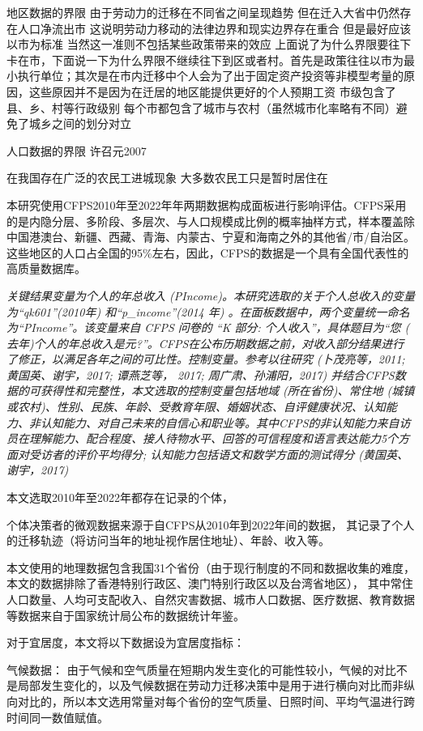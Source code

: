 \documentclass[a4paper,12pt,oneside, fontset=mac]{ctexbook} %
\begin{document}
地区数据的界限
由于劳动力的迁移在不同省之间呈现趋势 但在迁入大省中仍然存在人口净流出市 这说明劳动力移动的法律边界和现实边界存在重合 但是最好应该以市为标准 当然这一准则不包括某些政策带来的效应
上面说了为什么界限要往下卡在市，下面说一下为什么界限不继续往下到区或者村。首先是政策往往以市为最小执行单位；其次是在市内迁移中个人会为了出于固定资产投资等非模型考量的原因，这些原因并不是因为在迁居的地区能提供更好的个人预期工资
市级包含了县、乡、村等行政级别 每个市都包含了城市与农村（虽然城市化率略有不同）避免了城乡之间的划分对立


人口数据的界限
许召元2007

在我国存在广泛的农民工进城现象 大多数农民工只是暂时居住在


本研究使用CFPS2010年至2022年年两期数据构成面板进行影响评估。CFPS采用的是内隐分层、多阶段、多层次、与人口规模成比例的概率抽样方式，样本覆盖除中国港澳台、新疆、西藏、青海、内蒙古、宁夏和海南之外的其他省/市/自治区。这些地区的人口占全国的95\%左右，因此，CFPS的数据是一个具有全国代表性的高质量数据库。

\textit{关键结果变量为个人的年总收入 (PIncome)。本研究选取的关于个人总收入的变量为“qk601”(2010年) 和“p\_income”(2014 年) 。在面板数据中，两个变量统一命名为“PIncome”。该变量来自 CFPS 问卷的 “K 部分: 个人收入”，具体题目为“您 ( 去年)个人的年总收入是元?”。CFPS在公布历期数据之前，对收入部分结果进行了修正，以满足各年之间的可比性。控制变量。参考以往研究 (卜茂亮等，2011; 黄国英、谢宇，2017; 谭燕芝等， 2017; 周广肃、孙浦阳，2017) 并结合CFPS数据的可获得性和完整性，本文选取的控制变量包括地域 (所在省份)、常住地 (城镇或农村)、性别、民族、年龄、受教育年限、婚姻状态、自评健康状况、认知能力、非认知能力、对自己未来的自信心和职业等。其中CFPS的非认知能力来自访员在理解能力、配合程度、接人待物水平、回答的可信程度和语言表达能力5个方面对受访者的评价平均得分; 认知能力包括语文和数学方面的测试得分 (黄国英、谢宇，2017)}

本文选取2010年至2022年都存在记录的个体，

个体决策者的微观数据来源于自CFPS从2010年到2022年间的数据，
其记录了个人的迁移轨迹（将访问当年的地址视作居住地址）、年龄、收入等。


本文使用的地理数据包含我国31个省份（由于现行制度的不同和数据收集的难度，本文的数据排除了香港特别行政区、澳门特别行政区以及台湾省地区），
其中常住人口数量、人均可支配收入、自然灾害数据、城市人口数据、医疗数据、教育数据等数据来自于国家统计局公布的数据统计年鉴。


对于宜居度，本文将以下数据设为宜居度指标：

气候数据：
由于气候和空气质量在短期内发生变化的可能性较小，气候的对比不是局部发生变化的，以及气候数据在劳动力迁移决策中是用于进行横向对比而非纵向对比的，所以本文选用常量对每个省份的空气质量、日照时间、平均气温进行跨时间同一数值赋值。
\end{document}

